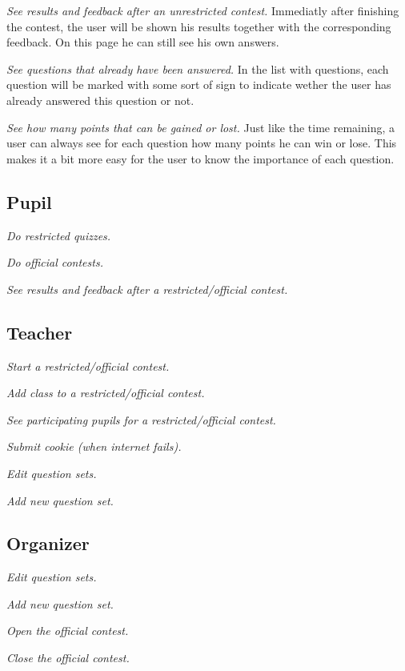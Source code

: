 \textit{See results and feedback after an unrestricted contest.} 
Immediatly after finishing the contest, the user will be shown his results together with the corresponding feedback. On this page he can still see his own answers. 

\textit{See questions that already have been answered.} 
In the list with questions, each question will be marked with some sort of sign to indicate wether the user has already answered this question or not. 

\textit{See how many points that can be gained or lost.}
Just like the time remaining, a user can always see for each question how many points he can win or lose. This makes it a bit more easy for the user to know the importance of each question. 

\subsection*{Pupil}

\textit{Do restricted quizzes.} 

\textit{Do official contests.} 

\textit{See results and feedback after a restricted/official contest.}


\subsection*{Teacher}

\textit{Start a restricted/official contest.} 

\textit{Add class to a restricted/official contest.} 

\textit{See participating pupils for a restricted/official contest.} 

\textit{Submit cookie (when internet fails).} 

\textit{Edit question sets.} 

\textit{Add new question set.} 


\subsection*{Organizer}

\textit{Edit question sets.} 

\textit{Add new question set.} 

\textit{Open the official contest.} 

\textit{Close the official contest.} 




